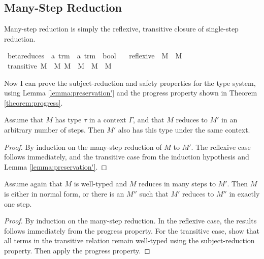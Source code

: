 \subsection{Many-Step Reduction}
Many-step reduction is simply the reflexive, transitive closure of single-step reduction.

\begin{implementation}
\isamarkupfalse%
\ beta{\isacharunderscore}reduces\ {\isacharcolon}{\isacharcolon}\ {\isachardoublequoteopen}{\isacharprime}a\ trm\ {\isasymRightarrow}\ {\isacharprime}a\ trm\ {\isasymRightarrow}\ bool{\isachardoublequoteclose}\ \isanewline
\ \ reflexive{\isacharcolon}\ \ {\isachardoublequoteopen}M\ {\isasymrightarrow}{\isasymbeta}\isactrlsup {\isacharasterisk}\ M{\isachardoublequoteclose}\isanewline
{\isacharbar}\ transitive{\isacharcolon}\ {\isachardoublequoteopen}{\isasymlbrakk}M\ {\isasymrightarrow}{\isasymbeta}\isactrlsup {\isacharasterisk}\ M{\isacharprime}{\isacharsemicolon}\ M{\isacharprime}\ {\isasymrightarrow}{\isasymbeta}\ M{\isacharprime}{\isacharprime}{\isasymrbrakk}\ {\isasymLongrightarrow}\ M\ {\isasymrightarrow}{\isasymbeta}\isactrlsup {\isacharasterisk}\ M{\isacharprime}{\isacharprime}{\isachardoublequoteclose}\isanewline
\end{implementation}

Now I can prove the subject-reduction and safety properties for the type system, using Lemma \ref{lemma:preservation'} and the progress property shown in Theorem \ref{theorem:progress}.

\begin{theorem}
Assume that \(M\) has type \(\tau\) in a context \(\Gamma\), and that \(M\) reduces to \(M'\) in an arbitrary number of steps.
Then \(M'\) also has this type under the same context.
\end{theorem}
\begin{proof}
By induction on the many-step reduction of \(M\) to \(M'\).
The reflexive case follows immediately, and the transitive case from the induction hypothesis and Lemma \ref{lemma:preservation'}.
\end{proof}

\begin{theorem}
Assume again that \(M\) is well-typed and \(M\) reduces in many steps to \(M'\).
Then \(M\) is either in normal form, or there is an \(M''\) such that \(M'\) reduces to \(M''\) in exactly one step.
\end{theorem}
\begin{proof}
By induction on the many-step reduction.
In the reflexive case, the results follows immediately from the progress property.
For the transitive case, show that all terms in the transitive relation remain well-typed using the subject-reduction property.
Then apply the progress property.
\end{proof}

